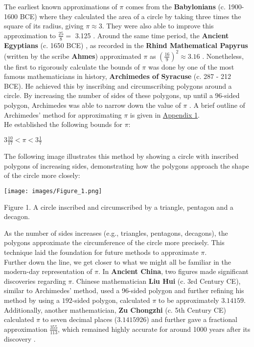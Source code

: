 \documentclass[12pt]{article}
\begin{document}
\noindent The earliest known approximations of $\pi$ comes from the \textbf{Babylonians} (c. 1900-1600 BCE) where they calculated the area of a circle by taking three times the square of its radius, giving $\pi \approx 3$. They were also able to improve this approximation to $\frac{25}{8} = $ 3.125 \cite{exploratorium_pi}. Around the same time period, the \textbf{Ancient Egyptians} (c. 1650 BCE) , as recorded in the \textbf{Rhind Mathematical Papyrus} (written by the scribe \textbf{Ahmes}) approximated $\pi$ as $(\frac{16}{9})^2 \approx 3.16$ \cite{exploratorium_pi}. Nonetheless, the first to rigorously calculate the bounds of $\pi$ was done by one of the most famous mathematicians in history, \textbf{Archimedes of Syracuse} (c. 287 - 212 BCE). He achieved this by inscribing and circumscribing polygons around a circle. By increasing the number of sides of these polygons, up until a $96$-sided polygon, Archimedes was able to narrow down the value of $\pi$ \cite{b2020archimedesshowedpiapproximately}. A brief outline of Archimedes' method for approximating $\pi$ is given in \hyperref[appendix:1]{Appendix 1}.\\

\noindent He established the following bounds for $\pi$:
\begin{center}
    $3\frac{10}{17} < \pi < 3\frac{1}{7}$
\end{center}
The following image illustrates this method by showing a circle with inscribed polygons of increasing sides, demonstrating how the polygons approach the shape of the circle more closely:
\begin{center}
    \texttt{[image: images/Figure\_1.png]}
    \caption{Figure 1. A circle inscribed and circumscribed by a triangle, pentagon and a decagon.}
\end{center}

\noindent As the number of sides increases (e.g., triangles, pentagons, decagons), the polygons approximate the circumference of the circle more precisely. This technique laid the foundation for future methods to approximate $\pi$. \\

\noindent Further down the line, we get closer to what we might all be familiar in the modern-day representation of $\pi$. In \textbf{Ancient China}, two figures made significant discoveries regarding $\pi$. Chinese mathematician \textbf{Liu Hui} (c. 3rd Century CE), similar to Archimedes' method, used a 96-sided polygon and further refining his method by using a $192$-sided polygon, calculated $\pi$ to be approximately $3.14159$. Additionally, another mathematician, \textbf{Zu Chongzhi} (c. 5th Century CE) calculated $\pi$ to seven decimal places ($3.1415926$) and further gave a fractional approximation $\frac{355}{113}$, which remained highly accurate for around 1000 years after its discovery \cite{straffin1998}.  \\
\end{document}
